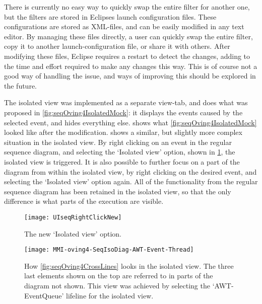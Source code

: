 There is currently no easy way to quickly swap the entire filter for another one, but the filters are stored in Eclipses launch configuration files.
These configurations are stored as XML-files, and can be easily modified in any text editor.
By managing these files directly, a user can quickly swap the entire filter, copy it to another launch-configuration file, or share it with others.
After modifying these files, Eclipse requires a restart to detect the changes, adding to the time and effort required to make any changes this way.
This is of course not a good way of handling the issue, and ways of improving this should be explored in the future.

The isolated view was implemented as a separate view-tab, and does what was proposed in \cref{fig:seqOving4IsolatedMock}: it displays the events caused by the selected event, and hides everything else.
 shows what \cref{fig:seqOving4IsolatedMock} looked like after the modification.
 shows a similar, but slightly more complex situation in the isolated view.
By right clicking on an event in the regular sequence diagram, and selecting the `Isolated view' option, shown in \cref{fig:UISeqRightClickNew}, the isolated view is triggered.
It is also possible to further focus on a part of the diagram from within the isolated view, by right clicking on the desired event, and selecting the `Isolated view' option again.
All of the functionality from the regular sequence diagram has been retained in the isolated view, so that the only difference is what parts of the execution are visible.
\begin{figure}[H]
	\centering
	\texttt{[image: UIseqRightClickNew]}
	\caption{The new `Isolated view' option.}
	\label{fig:UISeqRightClickNew}
\end{figure}

\begin{figure}[H]
	\centering
	\texttt{[image: MMI-oving4-SeqIsoDiag-AWT-Event-Thread]}
	\caption[How \cref{fig:seqOving4CrossLines} looks in the isolated view.]{How \cref{fig:seqOving4CrossLines} looks in the isolated view. The three last elements shown on the top are referred to in parts of the diagram not shown. This view was achieved by selecting the `AWT-EventQueue' lifeline for the isolated view.}
	\label{fig:MMI-oving4-SeqIsoDiag-AWT-Event-Thread}
\end{figure}

